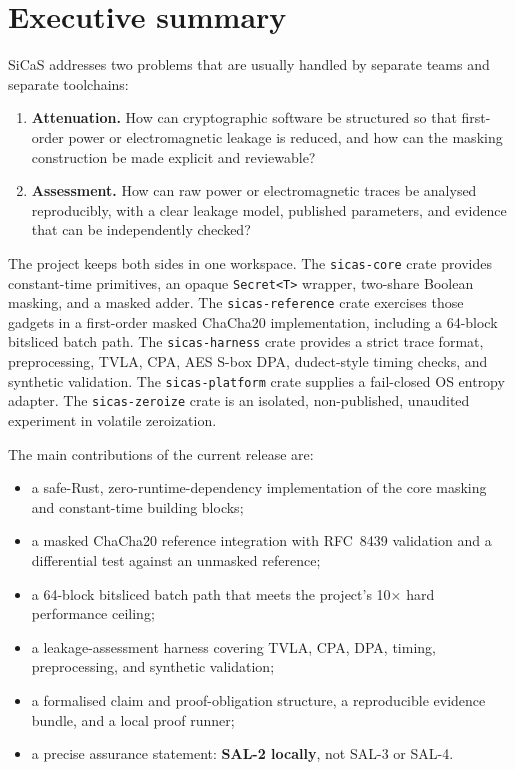 \documentclass[11pt,a4paper]{article}
\newcommand{\code}[1]{\texttt{#1}}
\theoremstyle{plain}
\theoremstyle{definition}
\theoremstyle{remark}
\begin{document}
\newpage
\tableofcontents
\newpage

\section{Executive summary}

SiCaS addresses two problems that are usually handled by separate teams and separate
toolchains:

\begin{enumerate}[leftmargin=1.5em]
  \item \textbf{Attenuation.} How can cryptographic software be structured so that
        first-order power or electromagnetic leakage is reduced, and how can the
        masking construction be made explicit and reviewable?
  \item \textbf{Assessment.} How can raw power or electromagnetic traces be analysed
        reproducibly, with a clear leakage model, published parameters, and evidence
        that can be independently checked?
\end{enumerate}

The project keeps both sides in one workspace. The \code{sicas-core} crate provides
constant-time primitives, an opaque \code{Secret<T>} wrapper, two-share Boolean masking,
and a masked adder. The \code{sicas-reference} crate exercises those gadgets in a
first-order masked ChaCha20 implementation, including a 64-block bitsliced batch path.
The \code{sicas-harness} crate provides a strict trace format, preprocessing, TVLA, CPA,
AES S-box DPA, dudect-style timing checks, and synthetic validation. The
\code{sicas-platform} crate supplies a fail-closed OS entropy adapter. The
\code{sicas-zeroize} crate is an isolated, non-published, unaudited experiment in
volatile zeroization.

The main contributions of the current release are:

\begin{itemize}[leftmargin=1.5em]
  \item a safe-Rust, zero-runtime-dependency implementation of the core masking and
        constant-time building blocks;
  \item a masked ChaCha20 reference integration with RFC~8439 validation and a
        differential test against an unmasked reference;
  \item a 64-block bitsliced batch path that meets the project's 10$\times$ hard
        performance ceiling;
  \item a leakage-assessment harness covering TVLA, CPA, DPA, timing, preprocessing,
        and synthetic validation;
  \item a formalised claim and proof-obligation structure, a reproducible evidence
        bundle, and a local proof runner;
  \item a precise assurance statement: \textbf{SAL-2 locally}, not SAL-3 or SAL-4.
\end{itemize}
\end{document}

